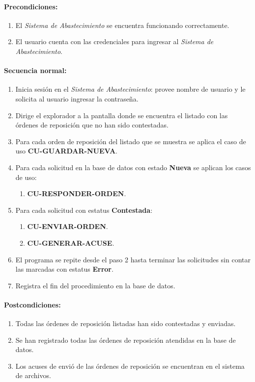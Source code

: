 \paragraph{Precondiciones:}
\begin{enumerate}
  \item El \textit{Sistema de Abastecimiento} se encuentra funcionando correctamente.
  \item El usuario cuenta con las credenciales para ingresar al \textit{Sistema de Abastecimiento}.
\end{enumerate}
\paragraph{Secuencia normal:}
\begin{enumerate}
  \item Inicia sesión en el \textit{Sistema de Abastecimiento}: provee nombre de usuario y le solicita al usuario ingresar la contraseña.
  \item Dirige el explorador a la pantalla donde se encuentra el listado con las órdenes de reposición que no han sido contestadas.
  \item Para cada orden de reposición del listado que se muestra se aplica el caso de uso \textbf{CU-GUARDAR-NUEVA}.
  \item Para cada solicitud en la base de datos con estado \textbf{Nueva} se aplican los casos de uso:
  \begin{enumerate}
    \item \textbf{CU-RESPONDER-ORDEN}.
  \end{enumerate}
  \item Para cada solicitud con estatus \textbf{Contestada}:
  \begin{enumerate}
    \item \textbf{CU-ENVIAR-ORDEN}.
    \item \textbf{CU-GENERAR-ACUSE}.
  \end{enumerate}
  \item El programa se repite desde el paso 2 hasta terminar las solicitudes sin contar las marcadas con estatus \textbf{Error}.
  \item Registra el fin del procedimiento en la base de datos.
\end{enumerate}
\paragraph{Postcondiciones:}
\begin{enumerate}
  \item Todas las órdenes de reposición listadas han sido contestadas y enviadas.
  \item Se han registrado todas las órdenes de reposición atendidas en la base de datos.
  \item Los acuses de envió de las órdenes de reposición se encuentran en el sistema de archivos.
\end{enumerate}
